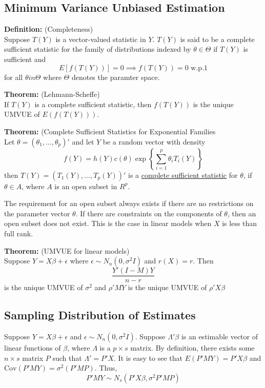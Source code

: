 \documentclass[12pt]{article}
\newcommand{\Cov}{\mathrm{Cov}}
\numberwithin{equation}{section}
\begin{document}
\subsection{Minimum Variance Unbiased Estimation}
\textbf{Definition:} (Completeness) \\
Suppose $T(Y)$ is a vector-valued statistic in $Y$. $T(Y)$ is said to be a complete sufficient statistic for the family of distributions indexed by $\theta \in \Theta$ if $T(Y)$ is sufficient and
\begin{equation*}
  E[f(T(Y))] = 0 \implies f(T(Y)) = 0 \text{ w.p.1}
\end{equation*}
for all $\theta in \Theta$ where $\Theta$ denotes the paramter space.

\textbf{Theorem:} (Lehmann-Scheffe) \\
If $T(Y)$ is a complete sufficient statistic, then $f(T(Y))$ is the unique UMVUE of $E(f(T(Y)))$.

\textbf{Theorem:} (Complete Sufficient Statistics for Exponential Families \\
Let $\theta = (\theta_1, \ldots, \theta_p)'$ and let $Y$ be a random vector with density
\begin{equation*}
  f(Y) = h(Y)c(\theta) \exp\left\{
    \sum_{i = 1}^p \theta_i T_i(Y)
    \right\}
\end{equation*}
then $T(Y) = (T_1(Y), \ldots, T_p(Y))'$ is a \underline{complete sufficient statistic} for $\theta$, if $\theta \in A$, where $A$ is an open subset in $R^p$.

The requirement for an open subset always exists if there are no restrictions on the parameter vector $\theta$. If there are constraints on the components of $\theta$, then an open subset does not exist. This is the case in linear models when $X$ is less than full rank.

\textbf{Theorem:} (UMVUE for linear models) \\
Suppose $Y = X\beta + \epsilon$ where $\epsilon \sim N_n(0, \sigma^2 I)$ and $r(X) = r$. Then
\begin{equation*}
  \frac{Y'(I - M)Y}{n - r}
\end{equation*}
is the unique UMVUE of $\sigma^2$ and $\rho' MY$ is the unique UMVUE of $\rho'X\beta$

\subsection{Sampling Distribution of Estimates}
Suppose $Y = X\beta + \epsilon$ and $\epsilon \sim N_n(0, \sigma^2 I)$. Suppose $\Lambda ' \beta$ is an estimable vector of linear functions of $\beta$, where $\Lambda$ is a $p \times s$ matrix. By definition, there exists some $n \times s$ matrix $P$ such that $\Lambda' = P'X$. It is easy to see that $E(P'MY) = P'X\beta$ and $\Cov(P'MY) = \sigma^2(P'MP)$. Thus,
\begin{equation*}
  P'MY \sim N_s(P'X\beta, \sigma^2 P'MP)
\end{equation*}
\end{document}
